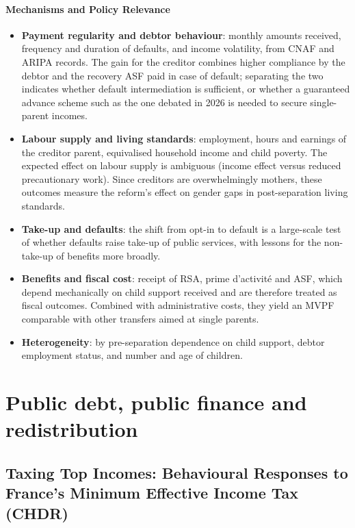\documentclass{article}
\begin{document}
\paragraph{Mechanisms and Policy Relevance}
\begin{itemize}
    \item \textbf{Payment regularity and debtor behaviour}: monthly amounts received, frequency and duration of defaults, and income volatility, from CNAF and ARIPA records. The gain for the creditor combines higher compliance by the debtor and the recovery ASF paid in case of default; separating the two indicates whether default intermediation is sufficient, or whether a guaranteed advance scheme such as the one debated in 2026 is needed to secure single-parent incomes.
    \item \textbf{Labour supply and living standards}: employment, hours and earnings of the creditor parent, equivalised household income and child poverty. The expected effect on labour supply is ambiguous (income effect versus reduced precautionary work). Since creditors are overwhelmingly mothers, these outcomes measure the reform's effect on gender gaps in post-separation living standards.
    \item \textbf{Take-up and defaults}: the shift from opt-in to default is a large-scale test of whether defaults raise take-up of public services, with lessons for the non-take-up of benefits more broadly.
    \item \textbf{Benefits and fiscal cost}: receipt of RSA, prime d'activité and ASF, which depend mechanically on child support received and are therefore treated as fiscal outcomes. Combined with administrative costs, they yield an MVPF comparable with other transfers aimed at single parents.
    \item \textbf{Heterogeneity}: by pre-separation dependence on child support, debtor employment status, and number and age of children.
\end{itemize}




\bigskip

\section*{Public debt, public finance and redistribution}

\subsection*{Taxing Top Incomes: Behavioural Responses to France's Minimum Effective Income Tax (CHDR)}
\end{document}
